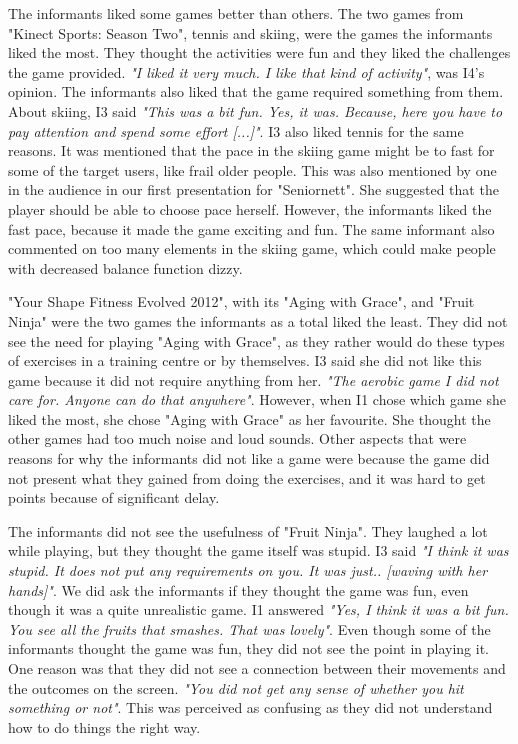 The informants liked some games better than others. The two games from "Kinect Sports: Season Two", tennis and skiing, were the games the informants liked the most. They thought the activities were fun and they liked the challenges the game provided. \emph{"I liked it very much. I like that kind of activity"}, was I4's opinion. The informants also liked that the game required something from them. About skiing, I3 said \emph{"This was a bit fun. Yes, it was. Because, here you have to pay attention and spend some effort [...]"}. I3 also liked tennis for the same reasons.  It was mentioned that the pace in the skiing game might be to fast for some of the target users, like frail older people. This was also mentioned by one in the audience in our first presentation for "Seniornett".  She suggested that the player should be able to choose pace herself. However, the informants liked the fast pace, because it made the game exciting and fun. The same informant also commented on too many elements in the skiing game, which could make people with decreased balance function dizzy. 

"Your Shape Fitness Evolved 2012", with its "Aging with Grace", and "Fruit Ninja" were the two games the informants as a total liked the least. They did not see the need for playing "Aging with Grace", as they rather would do these types of exercises in a training centre or by themselves. I3 said she did not like this game because it did not require anything from her. \emph{"The aerobic game I did not care for. Anyone can do that anywhere"}. However, when I1 chose which game she liked the most, she chose "Aging with Grace" as her favourite. She thought the other games had too much noise and loud sounds. Other aspects that were reasons for why the informants did not like a game were because the game did not present what they gained from doing the exercises, and it was hard to get points because of significant delay. 

The informants did not see the usefulness of "Fruit Ninja". They laughed a lot while playing, but they thought the game itself was stupid. I3 said \emph{"I think it was stupid. It does not put any requirements on you. It was just.. [waving with her hands]"}. We did ask the informants if they thought the game was fun, even though it was a quite unrealistic game. I1 answered \emph{"Yes, I think it was a bit fun. You see all the fruits that smashes. That was lovely"}. Even though some of the informants thought the game was fun, they did not see the point in playing it. One reason was that they did not see a connection between their movements and the outcomes on the screen. \emph{"You did not get any sense of whether you hit something or not"}. This was perceived as confusing as they did not understand how to do things the right way. 


